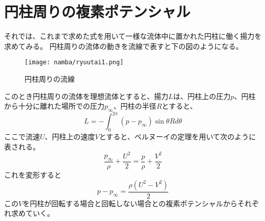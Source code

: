 \documentclass[10pt,b5paper,papersize,dvipdfmx]{jsbook}
\begin{document}
\section{円柱周りの複素ポテンシャル}
それでは、これまで求めた式を用いて一様な流体中に置かれた円柱に働く揚力を求めてみる。  円柱周りの流体の動きを流線で表すと下の図のようになる。
\begin{figure}[ht]
  \centering
\texttt{[image: namba/ryuutai1.png]}
\caption{円柱周りの流線}
\end{figure}
\par
このとき円柱周りの流体を理想流体とすると、揚力$L$は、円柱上の圧力$p$、円柱から十分に離れた場所での圧力$p_\infty$、円柱の半径$R$とすると、
\begin{equation}
L=-\int_0^{2\pi}(p-p_\infty)\sin\theta Rd\theta
\end{equation}
ここで流速$U$、円柱上の速度$V$とすると、ベルヌーイの定理を用いて次のように表される。
\begin{equation}
\frac{p_\infty}{\rho}+\frac{U^2}{2}=\frac{p}{\rho}+\frac{V^2}{2}
\end{equation}
これを変形すると
\begin{equation}
p-p_\infty=\frac{\rho(U^2-V^2)}{2}
\end{equation}
この$V$を円柱が回転する場合と回転しない場合との複素ポテンシャルからそれぞれ求めていく。
\end{document}
